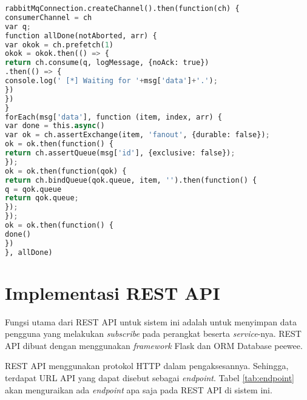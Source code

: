 \begin{enumerate}
\begin{lstlisting}[frame=single,caption={Pembuatan Exchange dan Queue Baru pada Websocket}, breaklines=true,label=pseudo:buatbaru, language=python]
rabbitMqConnection.createChannel().then(function(ch) {
consumerChannel = ch
var q;
function allDone(notAborted, arr) {
var okok = ch.prefetch(1)
okok = okok.then(() => {
return ch.consume(q, logMessage, {noAck: true}) 
.then(() => {
console.log(' [*] Waiting for '+msg['data']+'.');
})
})
}
forEach(msg['data'], function (item, index, arr) {
var done = this.async()
var ok = ch.assertExchange(item, 'fanout', {durable: false});
ok = ok.then(function() {
return ch.assertQueue(msg['id'], {exclusive: false});
});
ok = ok.then(function(qok) {
return ch.bindQueue(qok.queue, item, '').then(function() {
q = qok.queue
return qok.queue;
});
});
ok = ok.then(function() {
done()
})
}, allDone)
\end{lstlisting}
	
	\section{Implementasi REST API}
	Fungsi utama dari REST API untuk sistem ini adalah untuk menyimpan data pengguna yang melakukan \textit{subscribe} pada perangkat beserta \textit{service}-nya. REST API dibuat dengan menggunakan \textit{framework} Flask dan ORM Database peewee.
	
	REST API menggunakan protokol HTTP dalam pengaksesannya. Sehingga, terdapat URL API yang dapat disebut sebagai \textit{endpoint}. Tabel \ref{tab:endpoint} akan menguraikan ada \textit{endpoint} apa saja pada REST API di sistem ini. 
	
	\begin{longtable}{|p{}|p{}|p{}|p{}|} %
		

\end{longtable}
\end{enumerate}
